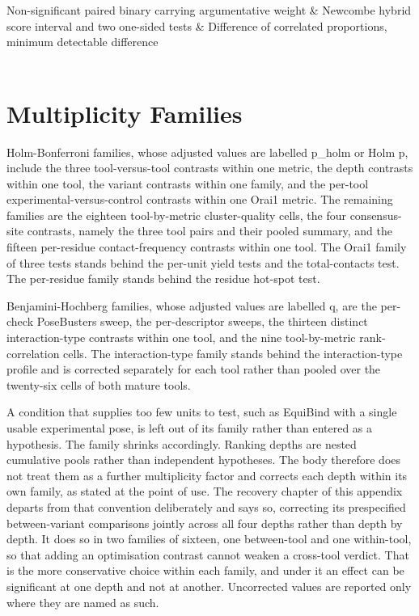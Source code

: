 \begin{longtable}[]
Non-significant paired binary carrying argumentative weight & Newcombe hybrid score interval and two one-sided tests & Difference of correlated proportions, minimum detectable difference \\
 \\
\end{longtable}

\hypertarget{multiplicity-families}{%
\section{Multiplicity Families}\label{multiplicity-families}}

Holm-Bonferroni families, whose adjusted values are labelled p\_holm or Holm p, include the three tool-versus-tool contrasts within one metric, the depth contrasts within one tool, the variant contrasts within one family, and the per-tool experimental-versus-control contrasts within one Orai1 metric. The remaining families are the eighteen tool-by-metric cluster-quality cells, the four consensus-site contrasts, namely the three tool pairs and their pooled summary, and the fifteen per-residue contact-frequency contrasts within one tool. The Orai1 family of three tests stands behind the per-unit yield tests and the total-contacts test. The per-residue family stands behind the residue hot-spot test.

Benjamini-Hochberg families, whose adjusted values are labelled q, are the per-check PoseBusters sweep, the per-descriptor sweeps, the thirteen distinct interaction-type contrasts within one tool, and the nine tool-by-metric rank-correlation cells. The interaction-type family stands behind the interaction-type profile and is corrected separately for each tool rather than pooled over the twenty-six cells of both mature tools.

A condition that supplies too few units to test, such as EquiBind with a single usable experimental pose, is left out of its family rather than entered as a hypothesis. The family shrinks accordingly. Ranking depths are nested cumulative pools rather than independent hypotheses. The body therefore does not treat them as a further multiplicity factor and corrects each depth within its own family, as stated at the point of use. The recovery chapter of this appendix departs from that convention deliberately and says so, correcting its prespecified between-variant comparisons jointly across all four depths rather than depth by depth. It does so in two families of sixteen, one between-tool and one within-tool, so that adding an optimisation contrast cannot weaken a cross-tool verdict. That is the more conservative choice within each family, and under it an effect can be significant at one depth and not at another. Uncorrected values are reported only where they are named as such.


